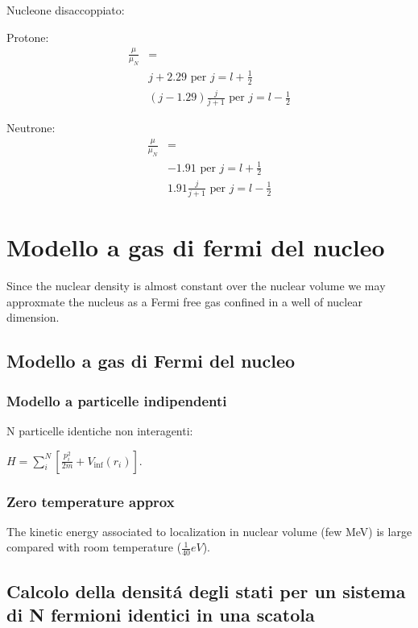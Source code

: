\documentclass[main.tex]{subfiles}
\begin{document}
Nucleone disaccoppiato:
\begin{itemize*}
\item Protone:
\begin{align*}
\frac{\mu}{\mu_N}&=\\
&j+2.29 \text{ per } j=l+\frac{1}{2}\\
&(j-1.29)\frac{j}{j+1} \text{ per } j=l-\frac{1}{2}
\end{align*}
\item Neutrone:
\begin{align*}
 \frac{\mu}{\mu_N}&=\\
 &-1.91 \text{ per } j=l+\frac{1}{2}\\
 &1.91\frac{j}{j+1} \text{ per } j=l-\frac{1}{2}
\end{align*}
\end{itemize*}

\chapter{Modello a gas di fermi del nucleo}

Since the nuclear density is almost constant over the nuclear volume we may approxmate the nucleus as a Fermi free gas confined in a well of nuclear dimension.

\section{Modello a gas di Fermi del  nucleo}

\subsection{Modello a particelle indipendenti}
N particelle identiche non interagenti:

$H=\sum_i^N [ \frac{p_i^2}{2m}+V_{\inf}(r_i)]$.

\subsection{Zero temperature approx}
The kinetic energy associated to localization in nuclear volume (few MeV) is large compared with room temperature ($\frac{1}{40} eV$).

\section{Calcolo della densit\'a degli stati per un sistema di N fermioni identici in una scatola}
\end{document}
